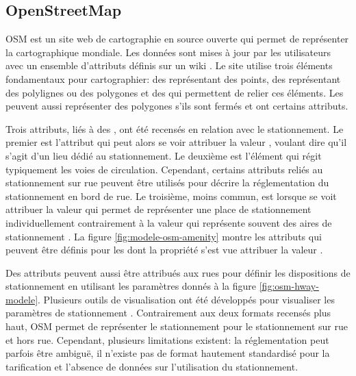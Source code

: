     \subsection{OpenStreetMap}\label{ssec:data-format-osm}
        \ac{OSM} est un site web de cartographie\parencite{osm_contributors_openstreetmap_2025} en source ouverte qui permet de représenter la cartographique mondiale. Les données sont mises à jour par les utilisateurs avec un ensemble d'attributs définis sur un wiki \parencite{osm_contributors_wiki_2025}. Le site utilise trois éléments fondamentaux pour cartographier: des  \fg{} représentant des points, des \fg{} représentant des polylignes ou des polygones et des \fg{} qui permettent de relier ces éléments. Les \fg{}  peuvent aussi représenter des polygones s'ils sont fermés et ont certains attributs. \par
        Trois attributs, liés à des \fg{}, ont été recensés en relation avec le stationnement. Le premier est l'attribut  \fg{} qui peut alors se voir attribuer la valeur \fg{}, voulant dire qu'il s'agit d'un lieu dédié au stationnement. Le deuxième est l'élément  \fg{} qui régit typiquement les voies de circulation. Cependant, certains attributs reliés au stationnement sur rue peuvent être utilisés pour décrire la réglementation du stationnement en bord de rue. Le troisième, moins commun, est lorsque  \fg{} se voit attribuer la valeur  \fg{} qui permet de représenter une place de stationnement individuellement contrairement à la valeur \fg{} qui représente souvent des aires de stationnement \parencite{osm_contributors_amenity_2025}. La figure  \ref{fig:modele-osm-amenity} montre les attributs qui peuvent être définis pour les \fg{} dont la propriété  \fg{} s'est vue attribuer la valeur \fg{}. \par 
        Des attributs peuvent aussi être attribués aux rues pour définir les dispositions de stationnement en utilisant les paramètres donnés à la figure \ref{fig:osm-hway-modele}. Plusieurs outils de visualisation ont été développés pour visualiser les paramètres de stationnement \parencite{osm_contributors_parking_2023}. Contrairement aux deux formats recensés plus haut, \ac{OSM} permet de représenter le stationnement pour le stationnement sur rue et hors rue. Cependant, plusieurs limitations existent: la réglementation peut parfois être ambiguë, il n'existe pas de format hautement standardisé pour la tarification et l'absence de données sur l'utilisation du stationnement.
    
